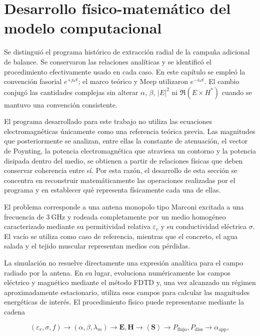 \section{Desarrollo físico-matemático del modelo computacional}
Se distinguió el programa histórico de extracción radial de la campaña adicional de balance. Se conservaron las relaciones analíticas y se identificó el procedimiento efectivamente usado en cada caso. En este capítulo se empleó la convención fasorial $e^{+j\omega t}$; el marco teórico y Meep utilizaron $e^{-i\omega t}$. El cambio conjugó las cantidades complejas sin alterar $\alpha$, $\beta$, $|E|^2$ ni $\Re(E\times H^*)$ cuando se mantuvo una convención consistente.

El programa desarrollado para este trabajo no utiliza las ecuaciones electromagnéticas únicamente como una referencia teórica previa. Las magnitudes que posteriormente se analizan, entre ellas la constante de atenuación, el vector de Poynting, la potencia electromagnética que atraviesa un contorno y la potencia disipada dentro del medio, se obtienen a partir de relaciones físicas que deben conservar coherencia entre sí. Por esta razón, el desarrollo de esta sección se concentra en reconstruir matemáticamente las operaciones realizadas por el programa y en establecer qué representa físicamente cada una de ellas.

El problema corresponde a una antena monopolo tipo Marconi excitada a una frecuencia de $3~\mathrm{GHz}$ y rodeada completamente por un medio homogéneo caracterizado mediante su permitividad relativa $\varepsilon_r$ y su conductividad eléctrica $\sigma$. El vacío se utiliza como caso de referencia, mientras que el concreto, el agua salada y el tejido muscular representan medios con pérdidas.

La simulación no resuelve directamente una expresión analítica para el campo radiado por la antena. En su lugar, evoluciona numéricamente los campos eléctrico y magnético mediante el método FDTD y, una vez alcanzado un régimen aproximadamente estacionario, utiliza esos campos para calcular las magnitudes energéticas de interés. El procedimiento físico puede representarse mediante la cadena

\begin{equation}
(\varepsilon_r,\sigma,f)
\longrightarrow
(\alpha,\beta,\lambda_m)
\longrightarrow
\mathbf{E},\mathbf{H}
\longrightarrow
\left\langle\mathbf{S}\right\rangle
\longrightarrow
P_{\mathrm{flujo}},P_{\mathrm{diss}}
\longrightarrow
\alpha_{\mathrm{app}},
\end{equation}

